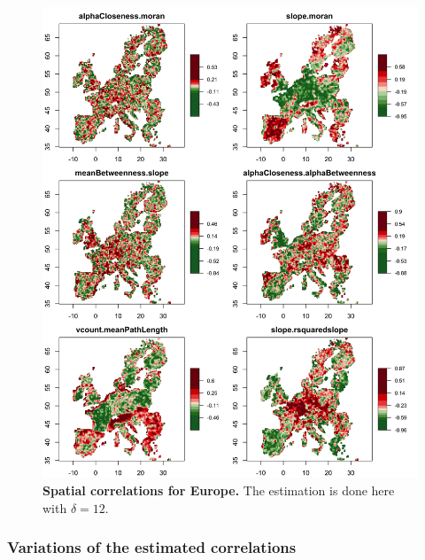 \begin{figure}
	\includegraphics[width=\linewidth]{figures/A-staticcorrelations-europe-correlations.jpg}
\caption{\textbf{Spatial correlations for Europe.} The estimation is done here with $\delta = 12$.\label{fig:app:staticcorrelations:europe-correlations}}
\end{figure}




\subsubsection{Variations of the estimated correlations}


